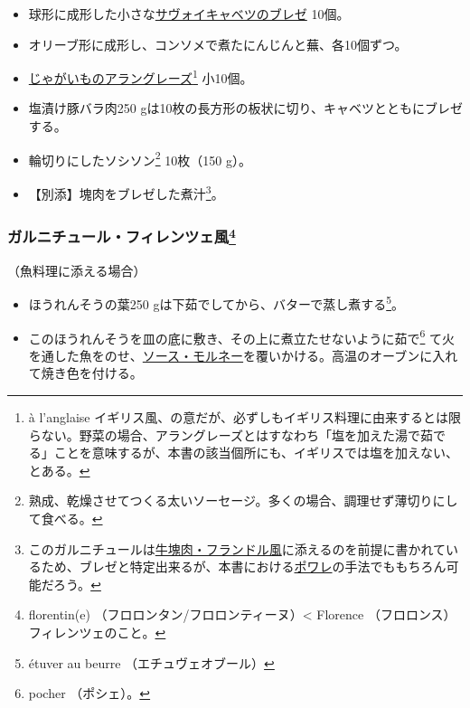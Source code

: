 \begin{recette}
\begin{itemize}
\item
  球形に成形した小さな\protect\hyperlink{chou-braise}{サヴォイキャベツのブレゼ}
  10個。
\item
  オリーブ形に成形し、コンソメで煮たにんじんと蕪、各10個ずつ。
\item
  \protect\hyperlink{pommes-de-terres-a-l-anglaise}{じゃがいものアラングレーズ}\footnote{à
    l'anglaise
    イギリス風、の意だが、必ずしもイギリス料理に由来するとは限らない。野菜の場合、アラングレーズとはすなわち「塩を加えた湯で茹でる」ことを意味するが、本書の該当個所にも、イギリスでは塩を加えない、とある。}
  小10個。
\item
  塩漬け豚バラ肉250
  gは10枚の長方形の板状に切り、キャベツとともにブレゼする。
\item
  輪切りにしたソシソン\footnote{熟成、乾燥させてつくる太いソーセージ。多くの場合、調理せず薄切りにして食べる。}
  10枚（150 g）。
\item
  【別添】塊肉をブレゼした煮汁\footnote{このガルニチュールは\protect\hyperlink{piece-de-boeuf-a-la-flammande}{牛塊肉・フランドル風}に添えるのを前提に書かれているため、ブレゼと特定出来るが、本書における\protect\hyperlink{les-poeles}{ポワレ}の手法でももちろん可能だろう。}。
\end{itemize}

\atoaki{}

\hypertarget{garniture-a-la-florentine}{%
\subsubsection[ガルニチュール・フィレンツェ風]{\texorpdfstring{ガルニチュール・フィレンツェ風\footnote{florentin(e)
  （フロロンタン/フロロンティーヌ）\textless{} Florence
  （フロロンス）フィレンツェのこと。}}{ガルニチュール・フィレンツェ風}}\label{garniture-a-la-florentine}}



（魚料理に添える場合）

\begin{itemize}
\item
  ほうれんそうの葉250 gは下茹でしてから、バターで蒸し煮する\footnote{étuver
    au beurre （エチュヴェオブール）}。
\item
  このほうれんそうを皿の底に敷き、その上に煮立たせないように茹で\footnote{pocher
    （ポシェ）。}
  て火を通した魚をのせ、\protect\hyperlink{sauce-mornay}{ソース・モルネー}を覆いかける。高温のオーブンに入れて焼き色を付ける。
\end{itemize}


\end{recette}
